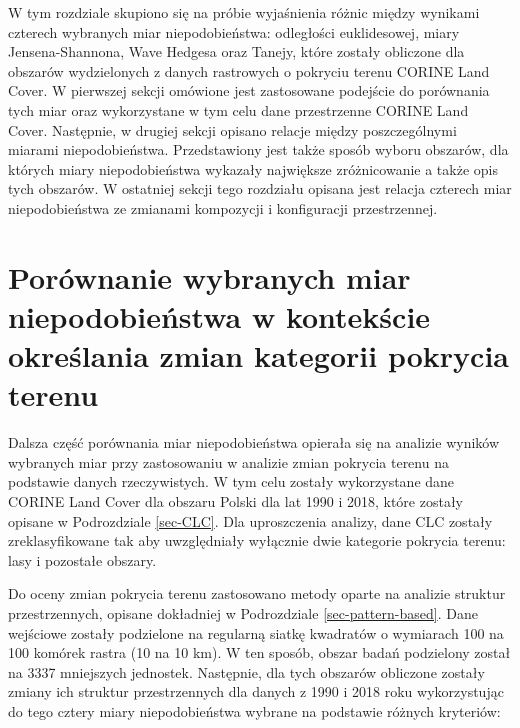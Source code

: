 \documentclass{amuthesis}
\begin{document}
W tym rozdziale skupiono się na próbie wyjaśnienia różnic między
wynikami czterech wybranych miar niepodobieństwa: odległości
euklidesowej, miary Jensena-Shannona, Wave Hedgesa oraz Tanejy, które
zostały obliczone dla obszarów wydzielonych z danych rastrowych o
pokryciu terenu CORINE Land Cover. W pierwszej sekcji omówione jest
zastosowane podejście do porównania tych miar oraz wykorzystane w tym
celu dane przestrzenne CORINE Land Cover. Następnie, w drugiej sekcji
opisano relacje między poszczególnymi miarami niepodobieństwa.
Przedstawiony jest także sposób wyboru obszarów, dla których miary
niepodobieństwa wykazały największe zróżnicowanie a także opis tych
obszarów. W ostatniej sekcji tego rozdziału opisana jest relacja
czterech miar niepodobieństwa ze zmianami kompozycji i konfiguracji
przestrzennej.

\hypertarget{poruxf3wnanie-wybranych-miar-niepodobieux144stwa-w-kontekux15bcie-okreux15blania-zmian-kategorii-pokrycia-terenu}{%
\section{Porównanie wybranych miar niepodobieństwa w kontekście
określania zmian kategorii pokrycia
terenu}\label{poruxf3wnanie-wybranych-miar-niepodobieux144stwa-w-kontekux15bcie-okreux15blania-zmian-kategorii-pokrycia-terenu}}

Dalsza część porównania miar niepodobieństwa opierała się na analizie
wyników wybranych miar przy zastosowaniu w analizie zmian pokrycia
terenu na podstawie danych rzeczywistych. W tym celu zostały
wykorzystane dane CORINE Land Cover dla obszaru Polski dla lat 1990 i
2018, które zostały opisane w Podrozdziale \ref{sec-CLC}. Dla
uproszczenia analizy, dane CLC zostały zreklasyfikowane tak aby
uwzględniały wyłącznie dwie kategorie pokrycia terenu: lasy i pozostałe
obszary.

Do oceny zmian pokrycia terenu zastosowano metody oparte na analizie
struktur przestrzennych, opisane dokładniej w Podrozdziale
\ref{sec-pattern-based}. Dane wejściowe zostały podzielone na regularną
siatkę kwadratów o wymiarach 100 na 100 komórek rastra (10 na 10 km). W
ten sposób, obszar badań podzielony został na 3337 mniejszych jednostek.
Następnie, dla tych obszarów obliczone zostały zmiany ich struktur
przestrzennych dla danych z 1990 i 2018 roku wykorzystując do tego
cztery miary niepodobieństwa wybrane na podstawie różnych kryteriów:
\end{document}
